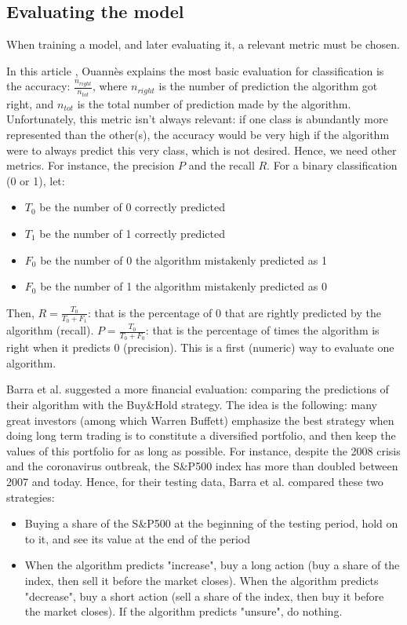 \documentclass[11pt]{article}
\begin{document}
\begin{onehalfspace}
\subsection{Evaluating the model}
\label{sec:LR_eval}

When training a model, and later evaluating it, a relevant metric must be chosen. 

In this article \cite{ouannes}, Ouannès explains the most basic evaluation for classification is the accuracy: $\frac{n_{right}}{n_{tot}}$, where $n_{right}$ is the number of prediction the algorithm got right, and $n_{tot}$ is the total number of prediction made by the algorithm. Unfortunately, this metric isn't always relevant: if one class is abundantly more represented than the other(s), the accuracy would be very high if the algorithm were to always predict this very class, which is not desired. Hence, we need other metrics. For instance, the precision $P$ and the recall $R$. For a binary classification (0 or 1), let:

\begin{itemize}
    \item $T_0$ be the number of 0 correctly predicted
    \item $T_1$ be the number of 1 correctly predicted
    \item $F_0$ be the number of 0 the algorithm mistakenly predicted as 1
    \item $F_0$ be the number of 1 the algorithm mistakenly predicted as 0
\end{itemize}

Then, $R = \frac{T_0}{T_0 + F_1}$: that is the percentage of 0 that are rightly predicted by the algorithm (recall). $P = \frac{T_0}{T_0 + F_0}$: that is the percentage of times the algorithm is right when it predicts 0 (precision). This is a first (numeric) way to evaluate one algorithm.

Barra et al. \cite{barra} suggested a more financial evaluation: comparing the predictions of their algorithm with the Buy\&Hold strategy. The idea is the following: many great investors (among which Warren Buffett) emphasize the best strategy when doing long term trading is to constitute a diversified portfolio, and then keep the values of this portfolio for as long as possible. For instance, despite the 2008 crisis and the coronavirus outbreak, the S\&P500 index has more than doubled between 2007 and today. Hence, for their testing data, Barra et al. compared these two strategies:

\begin{itemize}
    \item Buying a share of the S\&P500 at the beginning of the testing period, hold on to it, and see its value at the end of the period
    \item When the algorithm predicts "increase", buy a long action (buy a share of the index, then sell it before the market closes). When the algorithm predicts "decrease", buy a short action (sell a share of the index, then buy it before the market closes). If the algorithm predicts "unsure", do nothing. 
\end{itemize}


\end{onehalfspace}
\end{document}
